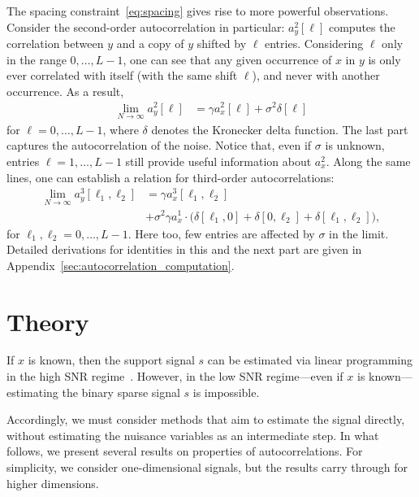 \documentclass[9pt,twocolumn,twoside,lineno]{pnas-new}
\begin{document}
The spacing constraint~\eqref{eq:spacing} gives rise to more powerful observations. Consider the second-order autocorrelation in particular: $a_y^2[\ell]$ computes the correlation between $y$ and a copy of $y$ shifted by $\ell$ entries. Considering $\ell$ only in the range $0, \ldots, L-1$, one can see that any given occurrence of $x$ in $y$ is only ever correlated with itself (with the same shift $\ell$), and never with another occurrence. As a result,
\begin{align} \label{eq:ac2_micrograph}
\lim_{N\to\infty} a_y^2[\ell] & = \gamma a_{x}^2[\ell] + \sigma^2\delta[\ell]
\end{align}
for $\ell = 0, \ldots, L-1$, where $\delta$ denotes the Kronecker delta function. The last part captures the autocorrelation of the noise. Notice that, even if $\sigma$ is unknown, entries $\ell = 1, \ldots, L-1$ still provide useful information about $a_x^2$.
Along the same lines, one can establish a relation for third-order autocorrelations:
\begin{align} \label{eq:ac3_micrograph}
\lim_{N\to\infty} a_y^3[\ell_1,\ell_2] & = \gamma a_{x}^3[\ell_1,\ell_2] \\& + \sigma^2\gamma a_{x}^1 \cdot \big(\delta[\ell_1,0]+\delta[0,\ell_2]+\delta[\ell_1,\ell_2]\big), 
 \nonumber
\end{align}
for $\ell_1,\ell_2 = 0, \ldots, L-1$. Here too, few entries are affected by $\sigma$ in the limit.
Detailed derivations for identities in this and the next part are given in Appendix~\ref{sec:autocorrelation_computation}.



\section{Theory} \label{sec:theory}

If $x$ is known, then the support signal $s$ can be estimated via linear programming  in the high SNR regime~\cite{azais2015spike,denoyelle2017support,bendory2016robust,bendory2017robust,bernstein2017deconvolution}. However, in the low SNR regime---even if $x$ is known---estimating the binary sparse signal $s$ is impossible. 


Accordingly, we must consider methods that aim to estimate the signal directly, without estimating the nuisance variables as an intermediate step. 
  In what follows, we present several results on properties of autocorrelations. For simplicity, we consider one-dimensional signals, but the results carry through for higher dimensions. 
\end{document}

